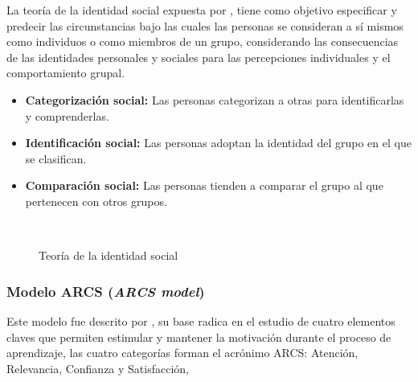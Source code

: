 La teoría de la identidad social expuesta por , tiene como objetivo especificar y
predecir las circunstancias bajo las cuales las personas se consideran a sí mismos como individuos o como 
miembros de un grupo, considerando las consecuencias de las identidades personales y sociales para las 
percepciones individuales y el comportamiento grupal.

\begin{itemize}
\item \textbf{Categorización social:} Las personas categorizan a otras para identificarlas y comprenderlas.
\item \textbf{Identificación social:} Las personas adoptan la identidad del grupo en el que se clasifican.
\item \textbf{Comparación social:} Las personas tienden a comparar el grupo al que pertenecen con otros
grupos.
\end{itemize}

\begin{figure}[ht]
\caption{Teoría de la identidad social}
\label{img:TIS}
\centering
{}
\\
{\footnotesize \citeA<basada en>{tajfel1979integrative}}
\end{figure}

\subsubsection{Modelo ARCS (\textit{ARCS model})}

Este modelo fue descrito por , su base radica en el estudio de cuatro elementos 
claves que permiten estimular y mantener la motivación durante el proceso de aprendizaje, las cuatro 
categorías forman el acrónimo ARCS: Atención, Relevancia, Confianza y Satisfacción, 

